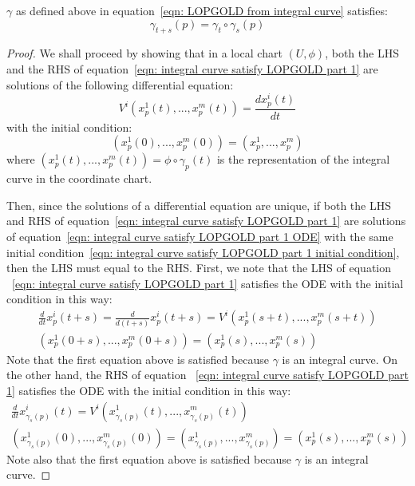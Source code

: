       \begin{theorem}
         $\gamma$ as defined above in equation~\ref{eqn: LOPGOLD from
         integral curve} satisfies:
         \begin{equation}
          \label{eqn: integral curve satisfy LOPGOLD part 1}
          \gamma_{t+s}(p) = \gamma_t \circ \gamma_s(p)
         \end{equation}
      \end{theorem}
      \begin{proof}
        We shall proceed by showing that in a local chart $(U, \phi)$, both
        the LHS and the RHS of equation~\ref{eqn: integral curve satisfy
        LOPGOLD part 1} are solutions of the following differential equation:
        \begin{equation}
          \label{eqn: integral curve satisfy LOPGOLD part 1 ODE}
          V^i(x_p^1(t),...,x^m_p(t)) = \frac{dx^i_p(t)}{dt}
        \end{equation}
        with the initial condition:
        \begin{equation}
          \label{eqn: integral curve satisfy LOPGOLD part 1 initial condition}
          \left(x_p^1(0),...,x_p^m(0)\right) = (x_p^1,...,x_p^m)
        \end{equation}
        where $(x_p^1(t),...,x^m_p(t)) = \phi \circ \gamma_p(t)$ is the
        representation of the integral curve in the coordinate chart.

        Then, since the solutions of a differential equation are unique, if
        both the LHS and RHS of equation~\ref{eqn: integral curve satisfy
        LOPGOLD part 1} are solutions of equation~\ref{eqn: integral curve
        satisfy LOPGOLD part 1 ODE} with the same initial condition~\ref{eqn:
        integral curve satisfy LOPGOLD part 1 initial condition}, then the
        LHS must equal to the RHS. First, we note that the LHS of equation
        ~\ref{eqn: integral curve satisfy LOPGOLD part 1} satisfies the ODE
        with the initial condition in this way:
        \begin{gather*}
          \frac{d}{dt}x^i_p(t+s) = \frac{d}{d(t+s)}x^i_p(t+s) =
          V^i(x_p^1(s+t),...,x^m_p(s+t)) \\
          \left(x_p^1(0+s),...,x_p^m(0+s)\right) = (x_p^1(s),...,x_p^m(s))
        \end{gather*}
        Note that the first equation above is satisfied because $\gamma$ is
        an integral curve. On the other hand, the RHS of equation ~\ref{eqn:
        integral curve satisfy LOPGOLD part 1} satisfies the ODE with the
        initial condition in this way:
        \begin{gather*}
          \frac{d}{dt}x^i_{\gamma_s(p)}(t) =
          V^i(x_{\gamma_s(p)}^1(t),...,x^m_{\gamma_s(p)}(t)) \\
          \left(x_{\gamma_s(p)}^1(0),...,x_{\gamma_s(p)}^m(0)\right) =
          (x_{\gamma_s(p)}^1,...,x^m_{\gamma_s(p)}) =
          (x_p^1(s),...,x_p^m(s))
        \end{gather*}
        Note also that the first equation above is satisfied because $\gamma$
        is an integral curve.


\end{proof}
